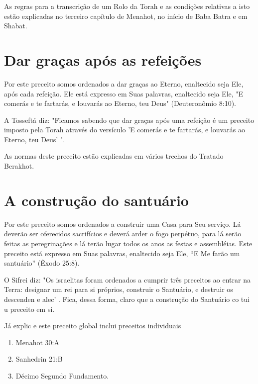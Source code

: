 As regras para a transcrição de um Rolo da Torah e as condições
re­lativas a isto estão explicadas no terceiro capítulo de Menahot, no
início de Ba­ba Batra e em Shabat.

\section{Dar graças após as refeições}

Por este preceito somos ordenados a dar graças ao Eterno, enalteci­do
seja Ele, após cada refeição. Ele está expresso em Suas palavras,
enaltecido seja Ele, "E comerás e te fartarás, e louvarás ao Eterno, teu
Deus" (Deuteronô­mio 8:10).

A Tosseftá diz: "Ficamos sabendo que dar graças após uma refeição é um
preceito imposto pela Torah através do versículo 'E comerás e te
fartarás, e louvarás ao Eterno, teu Deus' ".

As normas deste preceito estão explicadas em vários trechos do Tra­tado
Berakhot.

\section{A construção do santuário}

Por este preceito somos ordenados a construir uma Casa para Seu serviço.
Lá deverão ser oferecidos sacrifícios e deverá arder o fogo perpétuo,
para lá serão feitas as peregrinações e lá terão lugar todos os anos as
festas e assembléias. Este preceito está expresso em Suas palavras,
enaltecido seja Ele, ``E Me farão um santuário'' (Êxodo 25:8).

O Sifrei diz: "Os israelitas foram ordenados a cumprir três preceitos ao
entrar na Terra: designar um rei para si próprios, construir o
Santuário, e destruir os descenden e alec' . Fica, dessa forma, claro
que a constru­ção do Santuário co tui u preceito em si.

Já explic e este preceito global inclui preceitos individuais


\begin{enumerate}
\def\labelenumi{\arabic{enumi}.}
\setcounter{enumi}{43}
\item
 
 Menahot 30:A
 
\item
 
 Sanhedrin 21:B
 
\item
 
 Décimo Segundo Fundamento.
 
\end{enumerate}

